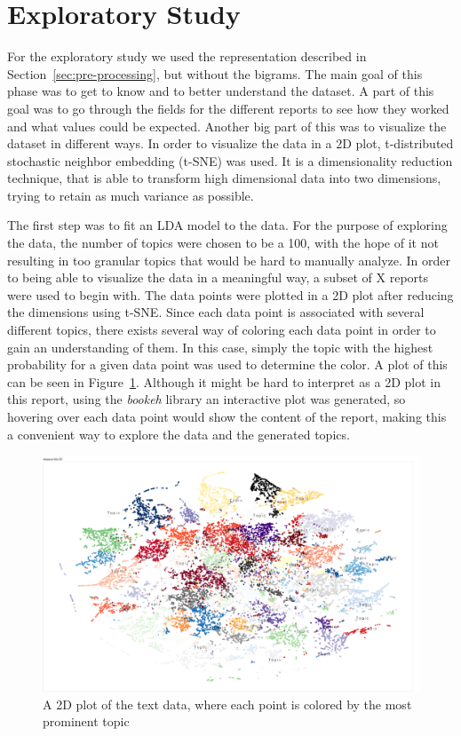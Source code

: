\section{Exploratory Study}\label{sec:exploratory-study}
For the exploratory study we used the representation described in Section~\ref{sec:pre-processing}, but without the bigrams.
The main goal of this phase was to get to know and to better understand the dataset.
A part of this goal was to go through the fields for the different reports to see how they worked and what values could be expected.
Another big part of this was to visualize the dataset in different ways.
In order to visualize the data in a 2D plot, t-distributed stochastic neighbor embedding (t-SNE) was used.
It is a dimensionality reduction technique, that is able to transform high dimensional data into two dimensions, trying to retain as much variance as possible.

The first step was to fit an LDA model to the data.
For the purpose of exploring the data, the number of topics were chosen to be a 100, with the hope of it not resulting in too granular topics that would be hard to manually analyze. %
In order to being able to visualize the data in a meaningful way, a subset of X reports were used to begin with.
The data points were plotted in a 2D plot after reducing the dimensions using t-SNE.
Since each data point is associated with several different topics, there exists several way of coloring each data point in order to gain an understanding of them.
In this case, simply the topic with the highest probability for a given data point was used to determine the color.
A plot of this can be seen in Figure~\ref{fig:lda-dist}.
Although it might be hard to interpret as a 2D plot in this report, using the \textit{bookeh} library an interactive plot was generated, so hovering over each data point would show the content of the report, making this a convenient way to explore the data and the generated topics.

\begin{figure}
    \centering
    \includegraphics[scale=0.25]{figures/lda-2d-distribution.png}
    \caption{A 2D plot of the text data, where each point is colored by the most prominent topic}
    \label{fig:lda-dist}
\end{figure}

